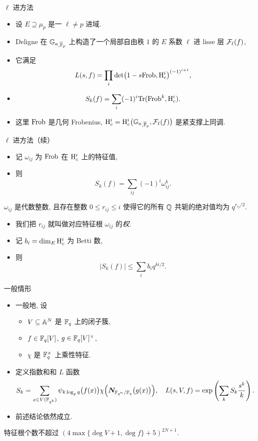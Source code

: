 \documentclass[aspectratio=169,handout]{ctexbeamer}
\begin{document}
\begin{frame}{$\ell$ 进方法}
	\begin{itemize}
		\item 设 $E\supseteq \mu_p$ 是一 $\ell\neq p$ 进域.
		\item Deligne 在 ${\mathbb{G}_a}_{,\overline{{\mathbb{F}}}_p}$ 上构造了一个局部自由秩 $1$ 的 $E$ 系数 $\ell$ 进 lisse 层 ${\mathcal{F}}_\ell(f)$,
		\item 它满足
		\[
			L(s,f)=\prod_i \det\bigl(1-s {\mathrm{Frob}},{\mathrm{H}}^i_c\bigr)^{(-1)^{i+1}},
		\]
		\item
		\[
			S_k(f)=\sum_i (-1)^i{\mathrm{Tr}}({\mathrm{Frob}}^k,{\mathrm{H}}_c^i).
		\]
		\item 这里 ${\mathrm{Frob}}$ 是几何 Frobenius, ${\mathrm{H}}_c^i={\mathrm{H}}_c^i\bigl({\mathbb{G}_a}_{,\overline{{\mathbb{F}}}_p},{\mathcal{F}}_\ell(f)\bigr)$ 是紧支撑上同调.
	\end{itemize}
\end{frame}


\begin{frame}{$\ell$ 进方法（续）}
	\begin{itemize}
		\item 记 $\omega_{ij}$ 为 ${\mathrm{Frob}}$ 在 ${\mathrm{H}}^i_c$ 上的特征值, 
		\item 则
		\[
			S_k(f)=\sum_{ij}(-1)^i \omega_{ij}^k.
		\]
	\end{itemize}
	\onslide<+->
	\begin{theorem}[][Deligne]
		$\omega_{ij}$ 是代数整数, 且存在整数 $0\le r_{ij}\le i$ 使得它的所有 ${\mathbb{Q}}$ 共轭的绝对值均为 $q^{r_{ij}/2}$.
	\end{theorem}
	\begin{itemize}
		\item 我们把 $r_{ij}$ 就叫做对应特征根 $\omega_{ij}$ 的\emph{权}.
		\item 记 $b_i=\dim_{E}{\mathrm{H}}^i_c$ 为 Betti 数, 
		\item 则
		\[
			|S_k(f)|\le \sum_i b_i q^{ki/2}.
		\]
	\end{itemize}
\end{frame}


\begin{frame}{一般情形}
	\begin{itemize}
		\item 一般地, 设
		\begin{itemize}
			\item $V\subseteq {\mathbb{A}}^N$ 是 ${\mathbb{F}}_q$ 上的闭子簇,
			\item $f\in {\mathbb{F}}_q[V]$, $g\in{\mathbb{F}}_q[V]^\times$,
			\item $\chi$ 是 ${\mathbb{F}}_q^\times$ 上乘性特征.
		\end{itemize}
		\item 定义指数和和 $L$ 函数
		\[
			S_k=\sum_{x\in V({\mathbb{F}}_{q^k})}\psi_{k\log_p q}\bigl(f(x)\bigr)\chi\Bigl({\boldsymbol{N}}_{{\mathbb{F}}_{q^n}/{\mathbb{F}}_q}\bigl(g(x)\bigr)\Bigr),\quad
			L(s,V,f)=\exp\left(\sum_k S_k\frac{s^k}k\right).
		\]
		\item 前述结论依然成立.
	\end{itemize}
	\onslide<+->
	\begin{theorem}[][Bombieri1978]
		特征根个数不超过 $(4\max\{\deg V+1,\deg f\}+5)^{2N+1}$.
	\end{theorem}
\end{frame}
\end{document}
